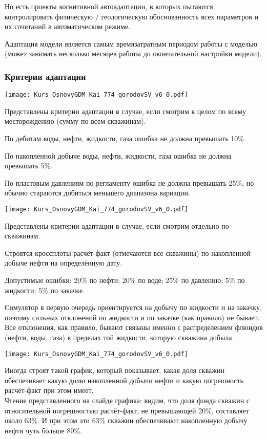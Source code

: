 \documentclass[main.tex]{subfiles}
\begin{document}
Но есть проекты когнитивной автоадаптации, в которых пытаются контролировать физическую / геологическую обоснованность всех параметров и их сочетаний в автоматическом режиме.

Адаптация модели является самым времязатратным периодом работы с моделью (может занимать несколько месяцев работы до окончательной настройки модели).

\subsubsection{Критерии адаптации}

\texttt{[image: Kurs\_OsnovyGDM\_Kai\_774\_gorodovSV\_v6\_0.pdf]}

Представлены критерии адаптации в случае, если смотрим в целом по всему месторождению (сумму по всем скважинам).

По дебитам воды, нефти, жидкости, газа ошибка не должна превышать 10\%.

По накопленной добыче воды, нефти, жидкости, газа ошибка не должна превышать 5\%.

По пластовым давлениям по регламенту ошибка не должна превышать 25\%, но обычно стараются добиться меньшего диапазона вариации.

\texttt{[image: Kurs\_OsnovyGDM\_Kai\_774\_gorodovSV\_v6\_0.pdf]}

Представлены критерии адаптации в случае, если смотрим отдельно по скважинам.

Строятся кроссплоты расчёт-факт (отмечаются все скважины) по накопленной добыче нефти на определённую дату.

Допустимые ошибки: 20\% по нефти; 20\% по воде; 25\% по давлению; 5\% по жидкости; 5\% по закачке.

Симулятор в первую очередь ориентируется на добычу по жидкости и на закачку, поэтому сильных отклонений по жидкости и по закачке (как правило) не бывает.
Все отклонения, как правило, бывают связаны именно с распределением флюидов (нефти, воды, газа) в пределах той жидкости, которую скважина добыла.

\texttt{[image: Kurs\_OsnovyGDM\_Kai\_774\_gorodovSV\_v6\_0.pdf]}

Иногда строят такой график, который показывает, какая доля скважин обеспечивает какую долю накопленной добычи нефти и какую погрешность расчёт-факт при этом имеет.
\\

Чтение представленного на слайде графика: видим, что доля фонда скважин с относительной погрешностью расчёт-факт, не превышающей 20\%, составляет около 63\%. И при этом эти 63\% скважин обеспечивают накопленную добычу нефти чуть больше 80\%.\\
\end{document}
